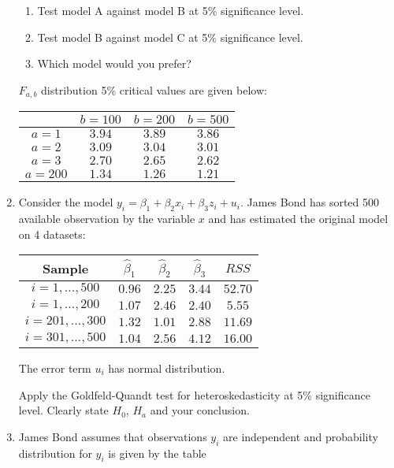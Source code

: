 \documentclass[12pt]{article}
\def \hb{\hat{\beta}}
\begin{document}
\begin{enumerate}
    \begin{enumerate}
      \item Test model A against model B at 5\% significance level.
      \item Test model B against model C at 5\% significance level.
      \item Which model would you prefer?
    \end{enumerate}

    $F_{a,b}$ distribution 5\% critical values are given below:

  \begin{tabular}{cccc}
      \toprule
      & $b=100$ & $b=200$ & $b=500$  \\
      \midrule
      $a=1$ & $3.94$ & $3.89$ & $3.86$  \\
      $a=2$ & $3.09$ & $3.04$ & $3.01$ \\ 
      $a=3$ & $2.70$ & $2.65$ & $2.62$ \\ 
      $a=200$ & $1.34$ & $1.26$ & $1.21$ \\
      \bottomrule
    \end{tabular}



\newpage
  \item  
Consider the model $y_i = \beta_1 + \beta_2 x_i + \beta_3 z_i + u_i$. 
James Bond has sorted 500 available observation by the variable $x$ and has estimated the original model on 4 datasets:

\begin{tabular}{c|cccc}
\toprule
Sample & $\hb_1$ & $\hb_2$ & $\hb_3$ & $RSS$ \\
\midrule
$i=1,\ldots, 500$ & $0.96$ & $2.25$ & $3.44$ & $52.70$ \\
$i=1,\ldots, 200$ & $1.07$ & $2.46$ & $2.40$ & $5.55$ \\
$i=201,\ldots, 300$ & $1.32$ & $1.01$ & $2.88$ & $11.69$ \\
$i=301,\ldots, 500$ & $1.04$ & $2.56$ & $4.12$ & $16.00$ \\
\bottomrule
\end{tabular}

The error term $u_i$ has normal distribution.

Apply the Goldfeld-Quandt test for heteroskedasticity at 5\% significance level. Clearly state $H_0$, $H_a$ and your conclusion.
 
  
  \item James Bond assumes that observations $y_i$ are independent and probability distribution for $y_i$ is given by the table


\end{enumerate}
\end{document}
